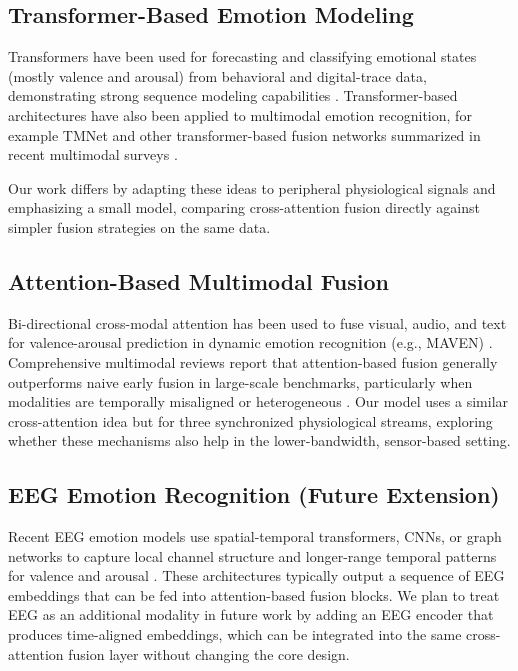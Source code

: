 \documentclass[11pt]{article}
\begin{document}
\subsection{Transformer-Based Emotion Modeling}
Transformers have been used for forecasting and classifying emotional states (mostly valence and arousal) from behavioral and digital-trace data, demonstrating strong sequence modeling capabilities \cite{paz-arbaizar_emotion_2025,noauthor_emotion_2025}. Transformer-based architectures have also been applied to multimodal emotion recognition, for example TMNet \cite{alam_tmnet_2025} and other transformer-based fusion networks summarized in recent multimodal surveys \cite{wu_comprehensive_2025,abdurahmon_general_2025}.

Our work differs by adapting these ideas to peripheral physiological signals and emphasizing a small model, comparing cross-attention fusion directly against simpler fusion strategies on the same data.

\subsection{Attention-Based Multimodal Fusion}
Bi-directional cross-modal attention has been used to fuse visual, audio, and text for valence-arousal prediction in dynamic emotion recognition (e.g., MAVEN) \cite{ahire_maven_2025,ahire_maven_nodate}. Comprehensive multimodal reviews report that attention-based fusion generally outperforms naive early fusion in large-scale benchmarks, particularly when modalities are temporally misaligned or heterogeneous \cite{wu_comprehensive_2025}. Our model uses a similar cross-attention idea but for three synchronized physiological streams, exploring whether these mechanisms also help in the lower-bandwidth, sensor-based setting.

\subsection{EEG Emotion Recognition (Future Extension)}
Recent EEG emotion models use spatial-temporal transformers, CNNs, or graph networks to capture local channel structure and longer-range temporal patterns for valence and arousal \cite{li_spatial_2025,cheng_eeg-based_2024,chen_eeg-based_2024,cao_emotion_2025}. These architectures typically output a sequence of EEG embeddings that can be fed into attention-based fusion blocks. We plan to treat EEG as an additional modality in future work by adding an EEG encoder that produces time-aligned embeddings, which can be integrated into the same cross-attention fusion layer without changing the core design.
\end{document}

